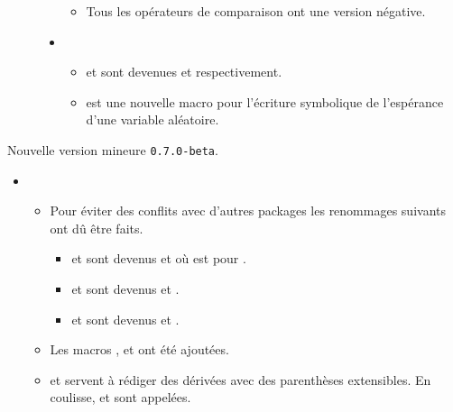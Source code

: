 \documentclass[12pt,a4paper]{book}
\begin{document}
\begin{description}
\begin{itemize}[itemsep=.5em]
\begin{itemize}[itemsep=.5em]
        \item Tous les opérateurs de comparaison ont une version négative.
    \end{itemize}




    \separation
    \item {}
    \begin{itemize}[itemsep=.5em]
        \item {} et  sont devenues  et  respectivement.
        
        \item {} est une nouvelle macro pour l'écriture symbolique de l'espérance d'une  variable aléatoire.
    \end{itemize}
\end{itemize}


\end{description}\begin{description}
\medskip
\item[2020-06-08] Nouvelle version mineure \verb+0.7.0-beta+.

\begin{itemize}[itemsep=.5em]
    \item {}
    \begin{itemize}[itemsep=.5em]
        \item Pour éviter des conflits avec d'autres packages les renommages suivants ont dû être faits.
        \begin{itemize}[itemsep=.5em, label=$\rightarrow$]
            \item {} et  sont devenus  et  où  est pour .

            \item {} et  sont devenus  et .

            \item {} et  sont devenus  et .
        \end{itemize}

		\item Les macros ,  et  ont été ajoutées.

 		\item {} et  servent à rédiger des dérivées avec des parenthèses extensibles. En coulisse,  et  sont appelées.


\end{itemize}
\end{itemize}
\end{description}
\end{document}
